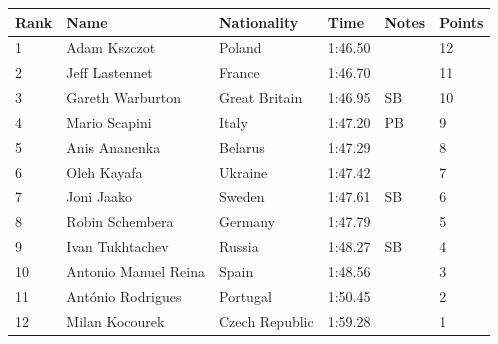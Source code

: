 \documentclass{article}
\begin{document}
\begin{tabular}{llllll}
\toprule
Rank & Name & Nationality & Time & Notes & Points \\
\midrule
1 & Adam Kszczot & Poland & 1:46.50 &  & 12 \\
2 & Jeff Lastennet & France & 1:46.70 &  & 11 \\
3 & Gareth Warburton & Great Britain & 1:46.95 & SB & 10 \\
4 & Mario Scapini & Italy & 1:47.20 & PB & 9 \\
5 & Anis Ananenka & Belarus & 1:47.29 &  & 8 \\
6 & Oleh Kayafa & Ukraine & 1:47.42 &  & 7 \\
7 & Joni Jaako & Sweden & 1:47.61 & SB & 6 \\
8 & Robin Schembera & Germany & 1:47.79 &  & 5 \\
9 & Ivan Tukhtachev & Russia & 1:48.27 & SB & 4 \\
10 & Antonio Manuel Reina & Spain & 1:48.56 &  & 3 \\
11 & António Rodrigues & Portugal & 1:50.45 &  & 2 \\
12 & Milan Kocourek & Czech Republic & 1:59.28 &  & 1 \\
\bottomrule
\end{tabular}
\end{document}
